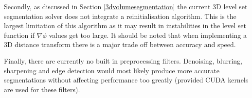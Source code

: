 Secondly, as discussed in Section \ref{3dvolumesegmentation} the current 3D level set segmentation solver does not integrate a reinitialisation algorithm. This is the largest limitation of this algorithm as it may result in instabilities in the level set function if $\nabla\phi$ values get too large. It should be noted that when implementing a 3D distance transform there is a major trade off between accuracy and speed.

Finally, there are currently no built in preprocessing filters. Denoising, blurring, sharpening and edge detection would most likely produce more accurate segmentations without affecting performance too greatly (provided CUDA kernels are used for these filters).




